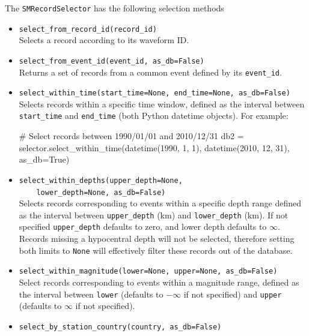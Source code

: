 The \verb=SMRecordSelector= has the following selection methods
\begin{itemize}
\item \verb;select_from_record_id(record_id);\\

Selects a record according to its waveform ID.

\item \verb;select_from_event_id(event_id, as_db=False);\\

Returns a set of records from a common event defined by its \verb=event_id=.

\item \verb;select_within_time(start_time=None, end_time=None, as_db=False);\\

Selects records within a specific time window, defined as the interval between \verb=start_time= and \verb=end_time= (both Python datetime objects). For example:

\begin{python}
# Select records between 1990/01/01 and 2010/12/31
db2 = selector.select_within_time(datetime(1990, 1, 1),
                                  datetime(2010, 12, 31),
                                  as_db=True)
\end{python}

\item \verb;select_within_depths(upper_depth=None,;\\
\verb;    lower_depth=None, as_db=False);\\

Selects records corresponding to events within a specific depth range defined as the interval between \verb=upper_depth= (km) and \verb=lower_depth= (km). If not specified \verb=upper_depth= defaults to zero, and lower depth defaults to $\infty$. Records missing a hypocentral depth will not be selected, therefore setting both limits to \verb=None= will effectively filter these records out of the database.

\item \verb;select_within_magnitude(lower=None, upper=None, as_db=False);\\

Select records corresponding to events within a magnitude range, defined as the interval between \verb=lower= (defaults to $-\infty$ if not specified) and \verb=upper= (defaults to $\infty$ if not specified).

\item \verb;select_by_station_country(country, as_db=False);\\


\end{itemize}
